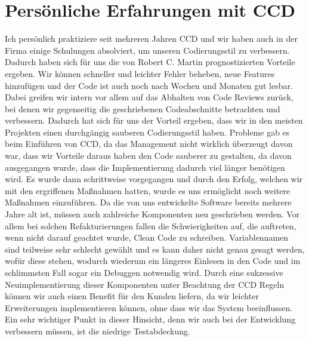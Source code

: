 \section{Persönliche Erfahrungen mit CCD}
Ich persönlich praktiziere seit mehreren Jahren CCD und wir haben auch in der Firma einige Schulungen absolviert, um unseren Codierungsstil zu verbessern. Dadurch haben sich für uns die von Robert C. Martin prognostizierten Vorteile ergeben. Wir können schneller und leichter Fehler beheben, neue Features hinzufügen und der Code ist auch noch nach Wochen und Monaten gut lesbar. Dabei greifen wir intern vor allem auf das Abhalten von Code Reviews zurück, bei denen wir gegenseitig die geschriebenen Codeabschnitte betrachten und verbessern. Dadurch hat sich für uns der Vorteil ergeben, dass wir in den meisten Projekten einen durchgängig sauberen Codierungsstil haben. Probleme gab es beim Einführen von CCD, da das Management nicht wirklich überzeugt davon war, dass wir Vorteile daraus haben den Code sauberer zu gestalten, da davon ausgegangen wurde, dass die Implementierung dadurch viel länger benötigen wird. Es wurde dann schrittweise vorgegangen und durch den Erfolg, welchen wir mit den ergriffenen Maßnahmen hatten, wurde es uns ermöglicht noch weitere Maßnahmen einzuführen. Da die von uns entwickelte Software bereits mehrere Jahre alt ist, müssen auch zahlreiche Komponenten neu geschrieben werden. Vor allem bei solchen Refakturierungen fallen die Schwierigkeiten auf, die auftreten, wenn nicht darauf geachtet wurde, Clean Code zu schreiben. Variablennamen sind teilweise sehr schlecht gewählt und es kann daher nicht genau gesagt werden, wofür diese stehen, wodurch wiederum ein längeres Einlesen in den Code und im schlimmsten Fall sogar ein Debuggen notwendig wird. Durch eine sukzessive Neuimplementierung dieser Komponenten unter Beachtung der CCD Regeln können wir auch einen Benefit für den Kunden liefern, da wir leichter Erweiterungen implementieren können, ohne dass wir das System beeinflussen. Ein sehr wichtiger Punkt in dieser Hinsicht, denn wir auch bei der Entwicklung verbessern müssen, ist die niedrige Testabdeckung. 


